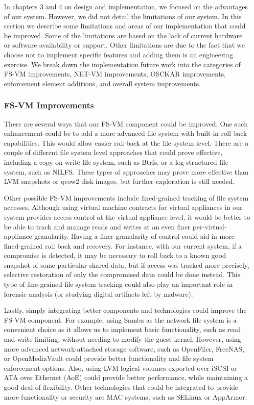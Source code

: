 In chapters 3 and 4 on design and implementation, we focused on the advantages of our system. However, we did not detail the limitations of our system. In this section we describe some limitations and areas of our implementation that could be improved. Some of the limitations are based on the lack of current hardware or software availability or support. Other limitations are due to the fact that we choose not to implement specific features and adding them is an engineering exercise. We break down the implementation future work into the categories of FS-VM improvements, NET-VM improvements, OSCKAR improvements, enforcement element additions, and overall system improvements.

\subsubsection{FS-VM Improvements}

There are several ways that our FS-VM component could be improved. One such enhancement could be to add a more advanced file system with built-in roll back capabilities. This would allow easier roll-back at the file system level. There are a couple of different file system level approaches that could prove effective, including a copy on write file system, such as Btrfs\cite{btrfs_website}, or a log-structured file system, such as NILFS\cite{nilfs_website}. These types of approaches may prove more effective than LVM snapshots or qcow2 disk images, but further exploration is still needed.

Other possible FS-VM improvements include fined-grained tracking of file system accesses. Although using virtual machine contracts for virtual appliances in our system provides access control at the virtual appliance level, it would be better to be able to track and manage reads and writes at an even finer per-virtual-appliance granularity. Having a finer granularity of control could aid in more fined-grained roll back and recovery. For instance, with our current system, if a compromise is detected, it may be necessary to roll back to a known good snapshot of some particular shared data, but if access was tracked more precisely, selective restoration of only the compromised data could be done instead. This type of fine-grained file system tracking could also play an important role in forensic analysis (or studying digital artifacts left by malware).

Lastly, simply integrating better components and technologies could improve the FS-VM component. For example, using Samba as the network file system is a convenient choice as it allows us to implement basic functionality, such as read and write limiting, without needing to modify the guest kernel. However, using more advanced network-attached storage software, such as OpenFiler\cite{openfiler_website}, FreeNAS\cite{freenas_website}, or OpenMediaVault\cite{openmediavault_website} could provide better functionality and file system enforcement options. Also, using LVM logical volumes exported over iSCSI or ATA over Ethernet (AoE) could provide better performance, while maintaining a good deal of flexibility. Other technologies that could be integrated to provide more functionality or security are MAC systems, such as SELinux or AppArmor.

